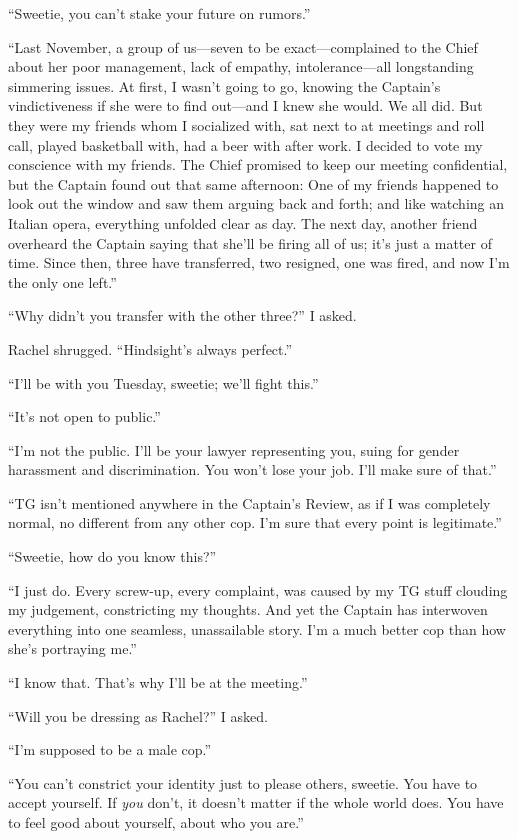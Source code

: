 ``Sweetie, you can't stake your future on rumors.''

``Last November, a group of us---seven to be exact---complained to the
Chief about her poor management, lack of empathy, intolerance---all
longstanding simmering issues. At first, I wasn't going to go, knowing
the Captain's vindictiveness if she were to find out---and I knew she
would. We all did. But they were my friends whom I socialized with, sat
next to at meetings and roll call, played basketball with, had a beer
with after work. I decided to vote my conscience with my friends. The
Chief promised to keep our meeting confidential, but the Captain found
out that same afternoon: One of my friends happened to look out the
window and saw them arguing back and forth; and like watching an Italian
opera, everything unfolded clear as day. The next day, another friend
overheard the Captain saying that she'll be firing all of us; it's just
a matter of time. Since then, three have transferred, two resigned, one
was fired, and now I'm the only one left.''

``Why didn't you transfer with the other three?'' I asked.

Rachel shrugged. ``Hindsight's always perfect.''

``I'll be with you Tuesday, sweetie; we'll fight this.''

``It's not open to public.''

``I'm not the public. I'll be your lawyer representing you, suing for
gender harassment and discrimination. You won't lose your job. I'll make
sure of that.''

``TG isn't mentioned anywhere in the Captain's Review, as if I was
completely normal, no different from any other cop. I'm sure that every
point is legitimate.''

``Sweetie, how do you know this?''

``I just do. Every screw-up, every complaint, was caused by my TG stuff
clouding my judgement, constricting my thoughts. And yet the Captain has
interwoven everything into one seamless, unassailable story. I'm a much
better cop than how she's portraying me.''

``I know that. That's why I'll be at the meeting.''

``Will you be dressing as Rachel?'' I asked.

``I'm supposed to be a male cop.''

``You can't constrict your identity just to please others, sweetie. You
have to accept yourself. If \emph{you} don't, it doesn't matter if the
whole world does. You have to feel good about yourself, about who you
are.''

